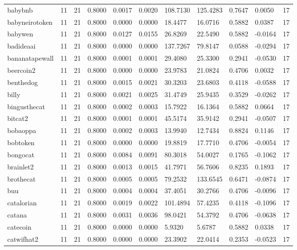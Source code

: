 \begin{table}[htbp]
\begin{tabular}{lllllllllll}
babybnb & 11 & 21 & 0.8000 & 0.0017 & 0.0020 & 108.7130 & 125.4283 & 0.7647 & 0.0050 & 17 \\
babyneirotoken & 11 & 21 & 0.8000 & 0.0000 & 0.0000 & 18.4477 & 16.0716 & 0.5882 & 0.0387 & 17 \\
babywen & 11 & 21 & 0.8000 & 0.0127 & 0.0155 & 26.8269 & 22.5490 & 0.5882 & -0.0164 & 17 \\
badideaai & 11 & 21 & 0.8000 & 0.0000 & 0.0000 & 137.7267 & 79.8147 & 0.0588 & -0.0294 & 17 \\
bananatapewall & 11 & 21 & 0.8000 & 0.0001 & 0.0001 & 29.4080 & 25.3300 & 0.2941 & -0.0530 & 17 \\
beercoin2 & 11 & 21 & 0.8000 & 0.0000 & 0.0000 & 23.9783 & 21.0824 & 0.4706 & 0.0032 & 17 \\
benthedog & 11 & 21 & 0.8000 & 0.0015 & 0.0021 & 30.3203 & 23.6803 & 0.4118 & -0.0588 & 17 \\
billy & 11 & 21 & 0.8000 & 0.0021 & 0.0025 & 31.4749 & 25.9435 & 0.3529 & -0.0262 & 17 \\
bingusthecat & 11 & 21 & 0.8000 & 0.0002 & 0.0003 & 15.7922 & 16.1364 & 0.5882 & 0.0664 & 17 \\
bitcat2 & 11 & 21 & 0.8000 & 0.0001 & 0.0001 & 45.5174 & 35.9142 & 0.2941 & -0.0507 & 17 \\
bobaoppa & 11 & 21 & 0.8000 & 0.0002 & 0.0003 & 13.9940 & 12.7434 & 0.8824 & 0.1146 & 17 \\
bobtoken & 11 & 21 & 0.8000 & 0.0000 & 0.0000 & 19.8819 & 17.7710 & 0.4706 & -0.0054 & 17 \\
bongocat & 11 & 21 & 0.8000 & 0.0084 & 0.0091 & 80.3018 & 54.0027 & 0.1765 & -0.1062 & 17 \\
brainlet2 & 11 & 21 & 0.8000 & 0.0013 & 0.0015 & 41.7971 & 56.7606 & 0.8235 & 0.1893 & 17 \\
brothecat & 11 & 21 & 0.8000 & 0.0005 & 0.0005 & 79.2532 & 133.6545 & 0.6471 & -0.0874 & 17 \\
buu & 11 & 21 & 0.8000 & 0.0004 & 0.0004 & 37.4051 & 30.2766 & 0.4706 & -0.0096 & 17 \\
catalorian & 11 & 21 & 0.8000 & 0.0019 & 0.0022 & 101.4894 & 57.4235 & 0.4118 & -0.1096 & 17 \\
catana & 11 & 21 & 0.8000 & 0.0031 & 0.0036 & 98.0421 & 54.3792 & 0.4706 & -0.0638 & 17 \\
catecoin & 11 & 21 & 0.8000 & 0.0000 & 0.0000 & 5.9320 & 5.6787 & 0.5882 & 0.0338 & 17 \\
catwifhat2 & 11 & 21 & 0.8000 & 0.0000 & 0.0000 & 23.3902 & 22.0414 & 0.2353 & -0.0523 & 17 \\

\end{tabular}
\end{table}
